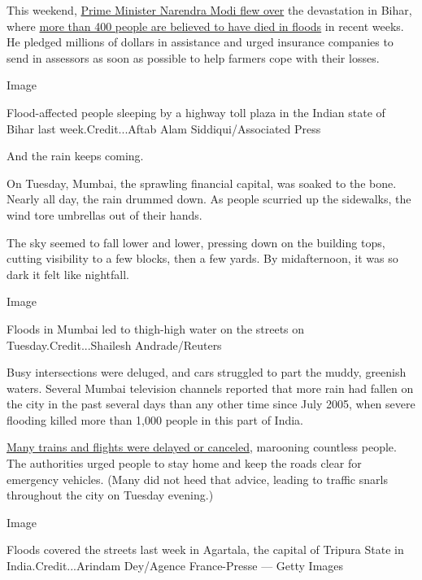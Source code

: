 This weekend,
\href{http://timesofindia.indiatimes.com/india/pm-modi-conducts-aerial-survey-of-flood-hit-bihar/articleshow/60232196.cms}{Prime
Minister Narendra Modi flew over} the devastation in Bihar, where
\href{http://www.ndtv.com/india-news/number-of-deaths-in-bihar-flood-rises-to-482-101-dead-in-up-1742702}{more
than 400 people are believed to have died in floods} in recent weeks. He
pledged millions of dollars in assistance and urged insurance companies
to send in assessors as soon as possible to help farmers cope with their
losses.

Image

Flood-affected people sleeping by a highway toll plaza in the Indian
state of Bihar last week.Credit...Aftab Alam Siddiqui/Associated Press

And the rain keeps coming.

On Tuesday, Mumbai, the sprawling financial capital, was soaked to the
bone. Nearly all day, the rain drummed down. As people scurried up the
sidewalks, the wind tore umbrellas out of their hands.

The sky seemed to fall lower and lower, pressing down on the building
tops, cutting visibility to a few blocks, then a few yards. By
midafternoon, it was so dark it felt like nightfall.

Image

Floods in Mumbai led to thigh-high water on the streets on
Tuesday.Credit...Shailesh Andrade/Reuters

Busy intersections were deluged, and cars struggled to part the muddy,
greenish waters. Several Mumbai television channels reported that more
rain had fallen on the city in the past several days than any other time
since July 2005, when severe flooding killed more than 1,000 people in
this part of India.

\href{http://www.hindustantimes.com/mumbai-news/traffic-nightmare-in-mumbai-as-city-reels-due-to-heavy-rains-flights-train-services-affected/story-gW23L6Ve9wZvNWzAWjghzN.html}{Many
trains and flights were delayed or canceled}, marooning countless
people. The authorities urged people to stay home and keep the roads
clear for emergency vehicles. (Many did not heed that advice, leading to
traffic snarls throughout the city on Tuesday evening.)

Image

Floods covered the streets last week in Agartala, the capital of Tripura
State in India.Credit...Arindam Dey/Agence France-Presse --- Getty
Images

